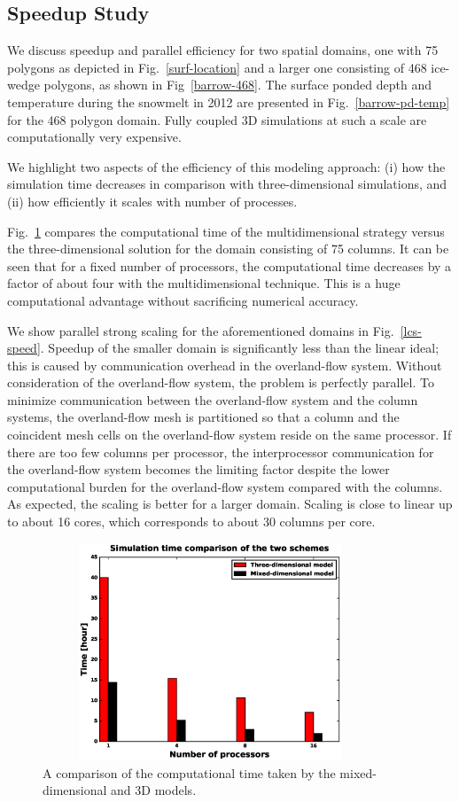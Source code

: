\documentclass[review,11pt]{elsarticle}
\begin{document}
\subsection{Speedup Study}
We discuss speedup and parallel efficiency for two spatial domains, one with 75 polygons as depicted in Fig.~\ref{surf-location} and a larger one consisting of 468 ice-wedge polygons, as shown in Fig~\ref{barrow-468}. The surface ponded depth and temperature during the snowmelt in 2012 are presented in Fig.~\ref{barrow-pd-temp} for the 468 polygon domain. Fully coupled 3D simulations at such a scale are computationally very expensive.

We highlight two aspects of the efficiency of this modeling approach: (i) how the simulation time decreases in comparison with three-dimensional simulations, and (ii) how efficiently it scales with number of processes. 

Fig.~\ref{3d-lcs-speed} compares the computational time of the multidimensional strategy versus the three-dimensional solution for the domain consisting of 75 columns. 
It can be seen that for a fixed number of processors, the computational time decreases by a factor of about four with the multidimensional technique. This is a huge computational advantage without sacrificing numerical accuracy. 

We show parallel strong scaling for the aforementioned domains in Fig.~\ref{lcs-speed}. Speedup of the smaller domain is significantly less than the linear ideal; this is caused by communication overhead in the overland-flow system. Without consideration of the overland-flow system, the problem is perfectly parallel. To minimize communication between the overland-flow system and the column systems, the overland-flow mesh is partitioned so that a column and the coincident mesh cells on the  overland-flow system reside on the same processor. If there are too few columns per processor, the interprocessor communication for the overland-flow system becomes the limiting factor despite the lower computational burden for the overland-flow system compared with the columns. 
As expected, the scaling is better for a larger domain. Scaling is close to linear up to about 16 cores, which corresponds to about 30 columns per core. 

\begin{figure}[!htpb]
\centering
\includegraphics[height = 6.5cm, width=10cm]{figures/compare3d-lcs-speed.eps}
\caption{A comparison of the computational time taken by the mixed-dimensional and 3D models.}
\label{3d-lcs-speed}
\end{figure}
\end{document}
